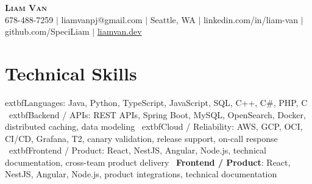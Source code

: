 \documentclass[letterpaper,11pt]{article}
\begin{document}

%
\begin{center}
    \textbf{\Huge \scshape Liam Van} \\ \vspace{1pt}
    \small 678-488-7259 $|$ \small {liamvanpj@gmail.com} $|$ Seattle, WA
 {{$|$ linkedin.com/in/liam-van} {$|$ github.com/SpeciLiam} {$|$ \href{https://liamvan.dev}{liamvan.dev}}}

\end{center}

\section{Technical Skills}
 \begin{itemize}[leftmargin=0.15in, label={}]
    \small{\item{
     	extbf{Languages}{: Java, Python, TypeScript, JavaScript, SQL, C++, C\#, PHP, C} \
     	extbf{Backend / APIs}{: REST APIs, Spring Boot, MySQL, OpenSearch, Docker, distributed caching, data modeling} \
     	extbf{Cloud / Reliability}{: AWS, GCP, OCI, CI/CD, Grafana, T2, canary validation, release support, on-call response} \
     	extbf{Frontend / Product}{: React, NestJS, Angular, Node.js, technical documentation, cross-team product delivery} \
     \textbf{Frontend / Product}{: React, NestJS, Angular, Node.js, product integrations, technical documentation} \\
    }}
 \end{itemize}
%

\end{document}
